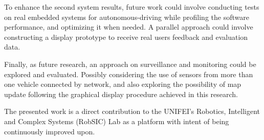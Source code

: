 To enhance the second system results, future work could involve conducting tests on real embedded systems for autonomous-driving while profiling the software performance, and optimizing it when needed. A parallel approach could involve constructing a display prototype to receive real users feedback and evaluation data. 

Finally, as future research, an approach on surveillance and monitoring could be explored and evaluated. Possibly considering the use of sensors from more than one vehicle connected by network, and also exploring the possibility of map update following the graphical display procedure achieved in this research.

The presented work is a direct contribution to the UNIFEI's Robotics, Intelligent and Complex Systems (RobSIC) Lab \cite{robsic-video-giovani} as a platform with intent of being continuously improved upon.



